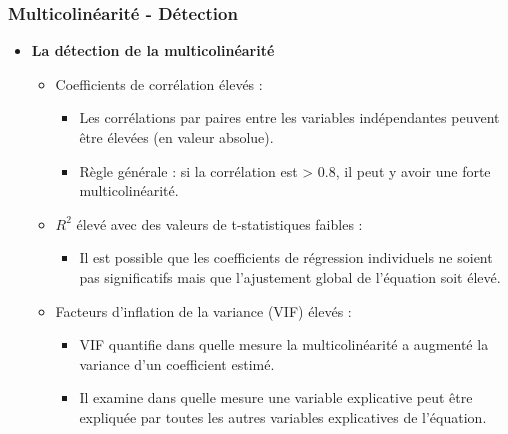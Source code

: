 \documentclass{beamer}
\begin{document}
\begin{frame}
\frametitle{Multicolinéarité - Détection}
\begin{itemize}
    \item \textbf{La détection de la multicolinéarité}
    \begin{itemize}
        \item Coefficients de corrélation élevés :
        \begin{itemize}
            \item Les corrélations par paires entre les variables indépendantes peuvent être élevées (en valeur absolue).
            \item Règle générale : si la corrélation est > 0.8, il peut y avoir une forte multicolinéarité.
        \end{itemize}
        \item \( R^2 \) élevé avec des valeurs de t-statistiques faibles :
        \begin{itemize}
            \item Il est possible que les coefficients de régression individuels ne soient pas significatifs mais que l’ajustement global de l’équation soit élevé.
        \end{itemize}
        \item Facteurs d’inflation de la variance (VIF) élevés :
        \begin{itemize}
            \item VIF quantifie dans quelle mesure la multicolinéarité a augmenté la variance d’un coefficient estimé.
            \item Il examine dans quelle mesure une variable explicative peut être expliquée par toutes les autres variables explicatives de l’équation.
        \end{itemize}
    \end{itemize}
\end{itemize}
\end{frame}
\end{document}
